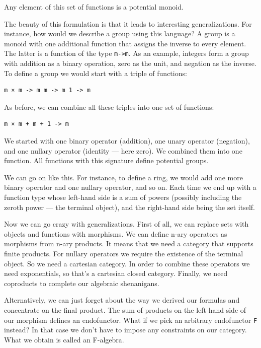 Any element of this set of functions is a potential monoid.

The beauty of this formulation is that it leads to interesting
generalizations. For instance, how would we describe a group using this
language? A group is a monoid with one additional function that assigns
the inverse to every element. The latter is a function of the type
\texttt{m-\textgreater{}m}. As an example, integers form a group with
addition as a binary operation, zero as the unit, and negation as the
inverse. To define a group we would start with a triple of functions:

\begin{verbatim}
m × m -> m m -> m 1 -> m
\end{verbatim}

As before, we can combine all these triples into one set of functions:

\begin{verbatim}
m × m + m + 1 -> m
\end{verbatim}

We started with one binary operator (addition), one unary operator
(negation), and one nullary operator (identity --- here zero). We
combined them into one function. All functions with this signature
define potential groups.

We can go on like this. For instance, to define a ring, we would add one
more binary operator and one nullary operator, and so on. Each time we
end up with a function type whose left-hand side is a sum of powers
(possibly including the zeroth power --- the terminal object), and the
right-hand side being the set itself.

Now we can go crazy with generalizations. First of all, we can replace
sets with objects and functions with morphisms. We can define n-ary
operators as morphisms from n-ary products. It means that we need a
category that supports finite products. For nullary operators we require
the existence of the terminal object. So we need a cartesian category.
In order to combine these operators we need exponentials, so that's a
cartesian closed category. Finally, we need coproducts to complete our
algebraic shenanigans.

Alternatively, we can just forget about the way we derived our formulas
and concentrate on the final product. The sum of products on the left
hand side of our morphism defines an endofunctor. What if we pick an
arbitrary endofunctor \texttt{F} instead? In that case we don't have to
impose any constraints on our category. What we obtain is called an
F-algebra.

